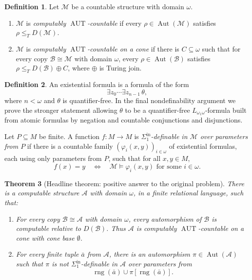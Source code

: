 \documentclass[12pt]{article}
\newtheorem{theorem}{Theorem}[section]
\theoremstyle{definition}
\newtheorem{definition}[theorem]{Definition}
\theoremstyle{remark}
\newcommand{\Aut}{\operatorname{Aut}}
\newcommand{\rng}{\operatorname{rng}}
\begin{document}
\begin{definition}
Let \(\mathcal M\) be a countable structure with domain \(\omega\).
\begin{enumerate}
\item \(\mathcal M\) is \emph{computably \(\operatorname{AUT}\)-countable} if every \(\rho\in\Aut(\mathcal M)\) satisfies \(\rho\leq_T D(\mathcal M)\).
\item \(\mathcal M\) is \emph{computably \(\operatorname{AUT}\)-countable on a cone} if there is \(C\subseteq\omega\) such that for every copy \(\mathcal B\cong\mathcal M\) with domain \(\omega\), every \(\rho\in\Aut(\mathcal B)\) satisfies \(\rho\leq_T D(\mathcal B)\oplus C\), where \(\oplus\) is Turing join.
\end{enumerate}
\end{definition}

\begin{definition}
An existential formula is a formula of the form
\[
\exists z_0\cdots \exists z_{n-1}\,\theta,
\]
where \(n<\omega\) and \(\theta\) is quantifier-free.  In the final nondefinability argument we prove the stronger statement allowing \(\theta\) to be a quantifier-free \(L_{\omega_1\omega}\)-formula built from atomic formulas by negation and countable conjunctions and disjunctions.

Let \(P\subseteq M\) be finite.  A function \(f:M\to M\) is \emph{\(\Sigma^{\mathrm{in}}_1\)-definable in \(\mathcal M\) over parameters from \(P\)} if there is a countable family \((\varphi_i(x,y))_{i\in\omega}\) of existential formulas, each using only parameters from \(P\), such that for all \(x,y\in M\),
\[
f(x)=y
\quad\Longleftrightarrow\quad
\mathcal M\models \varphi_i(x,y)\text{ for some }i\in\omega.
\]
\end{definition}

\begin{theorem}[Headline theorem: positive answer to the original problem]\label{thm:main}
There is a computable structure \(\mathcal A\) with domain \(\omega\), in a finite relational language, such that:
\begin{enumerate}
\item For every copy \(\mathcal B\cong\mathcal A\) with domain \(\omega\), every automorphism of \(\mathcal B\) is computable relative to \(D(\mathcal B)\).  Thus \(\mathcal A\) is computably \(\operatorname{AUT}\)-countable on a cone with cone base \(\emptyset\).
\item For every finite tuple \(\bar a\) from \(\mathcal A\), there is an automorphism \(\pi\in\Aut(\mathcal A)\) such that \(\pi\) is not \(\Sigma^{\mathrm{in}}_1\)-definable in \(\mathcal A\) over parameters from
\[
\rng(\bar a)\cup \pi[\rng(\bar a)].
\]
\end{enumerate}
\end{theorem}
\end{document}

